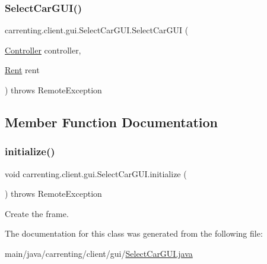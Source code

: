 \subsubsection{\texorpdfstring{SelectCarGUI()}{SelectCarGUI()}}
{\footnotesize\ttfamily carrenting.\+client.\+gui.\+Select\+Car\+G\+U\+I.\+Select\+Car\+G\+UI (\begin{DoxyParamCaption}\item[{\mbox{\hyperlink{classcarrenting_1_1client_1_1_controller}{Controller}}}]{controller,  }\item[{\mbox{\hyperlink{classcarrenting_1_1server_1_1jdo_1_1_rent}{Rent}}}]{rent }\end{DoxyParamCaption}) throws Remote\+Exception}



\subsection{Member Function Documentation}
\mbox{\label{classcarrenting_1_1client_1_1gui_1_1_select_car_g_u_i_a6e81cefc1c5bb31c0b0c5c7e766bc468}} 
\subsubsection{\texorpdfstring{initialize()}{initialize()}}
{\footnotesize\ttfamily void carrenting.\+client.\+gui.\+Select\+Car\+G\+U\+I.\+initialize (\begin{DoxyParamCaption}{ }\end{DoxyParamCaption}) throws Remote\+Exception}

Create the frame. 

The documentation for this class was generated from the following file\+:\begin{DoxyCompactItemize}
\item 
main/java/carrenting/client/gui/\mbox{\hyperlink{_select_car_g_u_i_8java}{Select\+Car\+G\+U\+I.\+java}}\end{DoxyCompactItemize}
